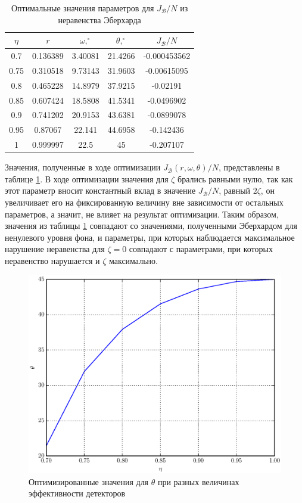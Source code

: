 \documentclass[%
master,         %
subf,           %
href,           %
,times         %
]{disser}
\numberwithin{equation}{section}
\numberwithin{figure}{section}
\begin{document}
\begin{table}[h]
\centering
\begin{tabular}{|c|c|c|c|c|}
\hline
$\eta$ & $r$ & $\omega,^\circ$ & $\theta,^\circ$ & $J_{\mathcal{B}} / N$
\\\hline
0.7 & 0.136389 & 3.40081 & 21.4266 & -0.000453562\\\hline
0.75 & 0.310518 & 9.73143 & 31.9603 & -0.00615095\\\hline
0.8 & 0.465228 & 14.8979 & 37.9215 & -0.02191\\\hline
0.85 & 0.607424 & 18.5808 & 41.5341 & -0.0496902\\\hline
0.9 & 0.741202 & 20.9153 & 43.6381 & -0.0899078\\\hline
0.95 & 0.87067 & 22.141 & 44.6958 & -0.142436\\\hline
1 & 0.999997 & 22.5 & 45 & -0.207107\\\hline
\end{tabular}
\caption{Оптимальные значения параметров для $J_{\mathcal{B}} / N$ из неравенства Эберхарда}
\label{tab:Eberhard_repeat}
\end{table}

Значения, полученные в ходе оптимизации $J_{\mathcal{B}}(r, \omega, \theta) / N$, представлены в таблице \ref{tab:Eberhard_repeat}. В ходе оптимизации значения для $\zeta$ брались равными нулю, так как этот параметр вносит константный вклад в значение $J_{\mathcal{B}} / N$, равный $2\zeta$, он увеличивает его на фиксированную величину вне зависимости от остальных параметров, а значит, не влияет на результат оптимизации. Таким образом, значения из таблицы \ref{tab:Eberhard_repeat} совпадают со значениями, полученными Эберхардом для ненулевого уровня фона, и параметры, при которых наблюдается максимальное нарушение неравенства для $\zeta = 0$ совпадают с параметрами, при которых неравенство нарушается и $\zeta$ максимально.

\begin{figure}[h]
\includegraphics[scale=0.7]{theta.eps}
\caption{Оптимизированные значения для $\theta$ при разных величинах эффективности детекторов}
\label{fig:theta_opt}
\end{figure}
\end{document}
